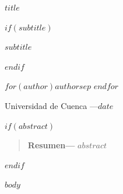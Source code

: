 \documentclass[10pt, a4paper]{article}
\newcommand{\autorsep}{\quad\textperiodcentered\quad}
\begin{document}
\begin{center}
    {\LARGE\bfseries $title$ \par}
    \vspace{0.5em}
    $if(subtitle)$
    {\normalsize $subtitle$ \par}
    \vspace{0.5em}
    $endif$
    {\normalsize $for(author)$$author$$sep$ \autorsep $endfor$ \par}
    \vspace{0.3em}
    {\small Universidad de Cuenca \enspace---\enspace $date$ \par}
\end{center}

\vspace{0.4em}

$if(abstract)$
\begin{quote}
\textbf{Resumen---} $abstract$
\end{quote}
$endif$

$body$
\end{document}
